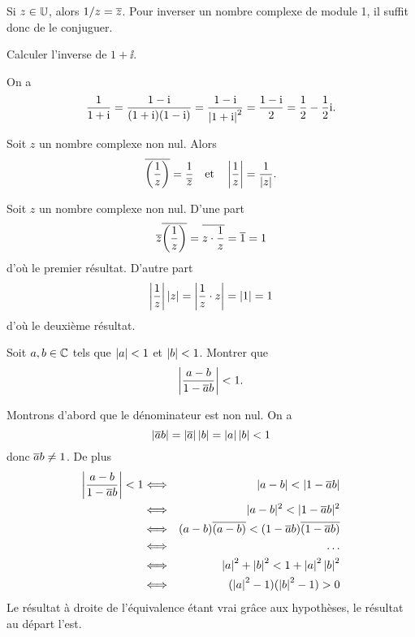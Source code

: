 \documentclass{magnolia}
\begin{document}
\begin{remarqueUnique}
\remarque Si $z\in\U$, alors $1/z=\overline{z}$. Pour inverser un nombre complexe de module 1, il suffit donc de le conjuguer.
\end{remarqueUnique}

\begin{exoUnique}
\exo Calculer l'inverse de $1+\ii$.
  \begin{sol}
  On a
  \[\frac{1}{1+{\rm i}}=\frac{1-{\rm i}}{(1+{\rm i})(1-{\rm i})}=\frac{1-{\rm i}}{\left|1+{\rm i}\right|^2}=\frac{1-{\rm i}}{2}=\frac{1}{2}-\frac{1}{2}{\rm i}.\]
  \end{sol}
\end{exoUnique}

\begin{proposition}
  Soit $z$ un nombre complexe non nul. Alors
  $$\overline{\left(\frac{1}{z}\right)}=\frac{1}{\overline{z}} \quad \text{et} \quad
    \left|\frac{1}{z}\right|=\frac{1}{\left|z\right|}.$$
\end{proposition}

\begin{preuve}
Soit $z$ un nombre complexe non nul. D'une part
\[\overline{z}\overline{\left(\frac{1}{z}\right)}=\overline{z\cdot\frac{1}{z}}=\overline{1}=1\]
d'où le premier résultat. D'autre part
\[\left|\frac{1}{z}\right|\left|z\right|=\left|\frac{1}{z}\cdot z\right|=\left|1\right|=1\]
d'où le deuxième résultat.
\end{preuve}

\begin{exoUnique}
\exo Soit $a,b\in\mathbb{C}$ tels que $\left|a\right|<1$ et $\left|b\right|<1$. Montrer que
  \[\left|\frac{a-b}{1-\overline{a}b}\right|<1.\]
\begin{sol}
Montrons d'abord que le dénominateur est non nul. On a
\[\left|\overline{a}b\right|=\left|\overline{a}\right|\left|b\right|=\left|a\right|\left|b\right|<1\]
donc $\overline{a}b\neq 1$. De plus
 \begin{eqnarray*}
 \abs{\frac{a-b}{1-\conj{a}b}}<1&\Longleftrightarrow &|a-b|<|1-\conj{a}b|\\
 &\Longleftrightarrow & |a-b|^2<|1-\conj{a}b|^2\\
 &\Longleftrightarrow & (a-b)\conj{(a-b)}<(1-\conj{a}b)\conj{(1-\conj{a}b)}\\
 &\Longleftrightarrow & \ldots \\
 &\Longleftrightarrow & \abs{a}^2+\abs{b}^2<1+\abs{a}^2\abs{b}^2 \\
 &\Longleftrightarrow & (\abs{a}^2-1)(\abs{b}^2-1)>0
 \end{eqnarray*}
  Le résultat à droite de l'équivalence étant vrai grâce aux hypothèses, le résultat au départ l'est.
  \end{sol}
\end{exoUnique}
\end{document}
